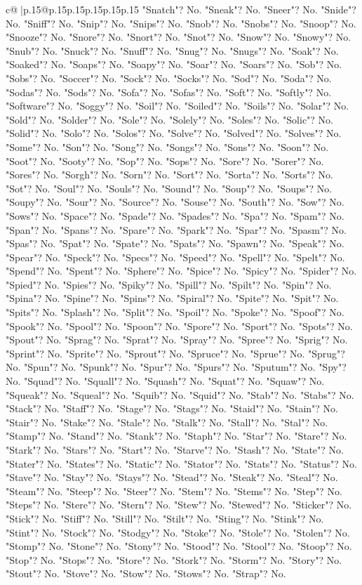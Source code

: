 \documentclass{article}
\begin{document}
{\begin{supertabular}{c@{$\;$}|p{.15\linewidth}@{}p{.15\linewidth}p{.15\linewidth}p{.15\linewidth}p{.15\linewidth}p{.15\linewidth}}
{{{"Snatch"? No. "Sneak"? No. "Sneer"? No. "Snide"? No. "Sniff"? No. "Snip"? No. "Snips"? No. "Snob"? No. "Snobs"? No. "Snoop"? No. "Snooze"? No. "Snore"? No. "Snort"? No. "Snot"? No. "Snow"? No. "Snowy"? No. "Snub"? No. "Snuck"? No. "Snuff"? No. "Snug"? No. "Snugs"? No. "Soak"? No. "Soaked"? No. "Soaps"? No. "Soapy"? No. "Soar"? No. "Soars"? No. "Sob"? No. "Sobs"? No. "Soccer"? No. "Sock"? No. "Socks"? No. "Sod"? No. "Soda"? No. "Sodas"? No. "Sods"? No. "Sofa"? No. "Sofas"? No. "Soft"? No. "Softly"? No. "Software"? No. "Soggy"? No. "Soil"? No. "Soiled"? No. "Soils"? No. "Solar"? No. "Sold"? No. "Solder"? No. "Sole"? No. "Solely"? No. "Soles"? No. "Solic"? No. "Solid"? No. "Solo"? No. "Solos"? No. "Solve"? No. "Solved"? No. "Solves"? No. "Some"? No. "Son"? No. "Song"? No. "Songs"? No. "Sons"? No. "Soon"? No. "Soot"? No. "Sooty"? No. "Sop"? No. "Sops"? No. "Sore"? No. "Sorer"? No. "Sores"? No. "Sorgh"? No. "Sorn"? No. "Sort"? No. "Sorta"? No. "Sorts"? No. "Sot"? No. "Soul"? No. "Souls"? No. "Sound"? No. "Soup"? No. "Soups"? No. "Soupy"? No. "Sour"? No. "Source"? No. "Souse"? No. "South"? No. "Sow"? No. "Sows"? No. "Space"? No. "Spade"? No. "Spades"? No. "Spa"? No. "Spam"? No. "Span"? No. "Spans"? No. "Spare"? No. "Spark"? No. "Spar"? No. "Spasm"? No. "Spas"? No. "Spat"? No. "Spate"? No. "Spats"? No. "Spawn"? No. "Speak"? No. "Spear"? No. "Speck"? No. "Specs"? No. "Speed"? No. "Spell"? No. "Spelt"? No. "Spend"? No. "Spent"? No. "Sphere"? No. "Spice"? No. "Spicy"? No. "Spider"? No. "Spied"? No. "Spies"? No. "Spiky"? No. "Spill"? No. "Spilt"? No. "Spin"? No. "Spina"? No. "Spine"? No. "Spins"? No. "Spiral"? No. "Spite"? No. "Spit"? No. "Spits"? No. "Splash"? No. "Split"? No. "Spoil"? No. "Spoke"? No. "Spoof"? No. "Spook"? No. "Spool"? No. "Spoon"? No. "Spore"? No. "Sport"? No. "Spots"? No. "Spout"? No. "Sprag"? No. "Sprat"? No. "Spray"? No. "Spree"? No. "Sprig"? No. "Sprint"? No. "Sprite"? No. "Sprout"? No. "Spruce"? No. "Sprue"? No. "Sprug"? No. "Spun"? No. "Spunk"? No. "Spur"? No. "Spurs"? No. "Sputum"? No. "Spy"? No. "Squad"? No. "Squall"? No. "Squash"? No. "Squat"? No. "Squaw"? No. "Squeak"? No. "Squeal"? No. "Squib"? No. "Squid"? No. "Stab"? No. "Stabs"? No. "Stack"? No. "Staff"? No. "Stage"? No. "Stags"? No. "Staid"? No. "Stain"? No. "Stair"? No. "Stake"? No. "Stale"? No. "Stalk"? No. "Stall"? No. "Stal"? No. "Stamp"? No. "Stand"? No. "Stank"? No. "Staph"? No. "Star"? No. "Stare"? No. "Stark"? No. "Stars"? No. "Start"? No. "Starve"? No. "Stash"? No. "State"? No. "Stater"? No. "States"? No. "Static"? No. "Stator"? No. "Stats"? No. "Status"? No. "Stave"? No. "Stay"? No. "Stays"? No. "Stead"? No. "Steak"? No. "Steal"? No. "Steam"? No. "Steep"? No. "Steer"? No. "Stem"? No. "Stems"? No. "Step"? No. "Steps"? No. "Stere"? No. "Stern"? No. "Stew"? No. "Stewed"? No. "Sticker"? No. "Stick"? No. "Stiff"? No. "Still"? No. "Stilt"? No. "Sting"? No. "Stink"? No. "Stint"? No. "Stock"? No. "Stodgy"? No. "Stoke"? No. "Stole"? No. "Stolen"? No. "Stomp"? No. "Stone"? No. "Stony"? No. "Stood"? No. "Stool"? No. "Stoop"? No. "Stop"? No. "Stops"? No. "Store"? No. "Stork"? No. "Storm"? No. "Story"? No. "Stout"? No. "Stove"? No. "Stow"? No. "Stows"? No. "Strap"? No. }}}
\end{supertabular}}
\end{document}
